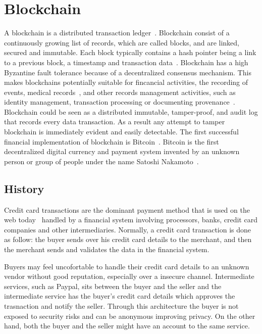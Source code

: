\chapter{Blockchain}
\label{blockchain}

A blockchain is a distributed transaction ledger~\cite{nakamoto2012bitcoin}.
Blockchain consist of a continuously growing list of records, which are called blocks, and are linked, secured and immutable.
Each block typically contains a hash pointer being a link to a previous block, a timestamp and transaction data~\cite{wiki:blockchain}.
Blockchain has a high Byzantine fault tolerance because of a decentralized consensus mechanism.
This makes blockchains potentially suitable for fincancial activities, the recording of events, medical records~\cite{blockchain_ehr,Azaria2016}, and other records management activities,
such as identity management, transaction processing or documenting provenance~\cite{wiki:blockchain}. Blockchain could be seen as a distributed immutable, tamper-proof,
and audit log that records every data transaction. As a result any attempt to tamper blockchain is immediately evident and easily detectable.
The first successful financial implementation of blockchain is Bitcoin~\cite{nakamoto2012bitcoin}.
Bitcoin is the first decentralized digital currency and payment system invented by an unknown person or group of people under the name Satoshi Nakamoto~\cite{nakamoto2012bitcoin,wiki:bitcoin}.

\section{History}\label{blockchain:history}

Credit card transactions are the dominant payment method that is used on the web today~\cite{Narayanan:2016:BCT:2994437} handled by a financial
system involving processors, banks, credit card companies and other intermediaries. Normally, a credit card transaction is done as follow:
the buyer sends over his credit card details to the merchant, and then the merchant sends and validates the data in the financial system.

Buyers may feel uncofortable to handle their credit card details to an unknown vendor without good reputation, especially over a insecure channel.
Intermediate services, such as Paypal, sits between the buyer and the seller and the intermediate service has the buyer's credit card details which approves
the trasnaction and notify the seller. Through this architecture the buyer is not exposed to security risks and can be anonymous improving privacy. On the other hand,
both the buyer and the seller might have an account to the same service.

